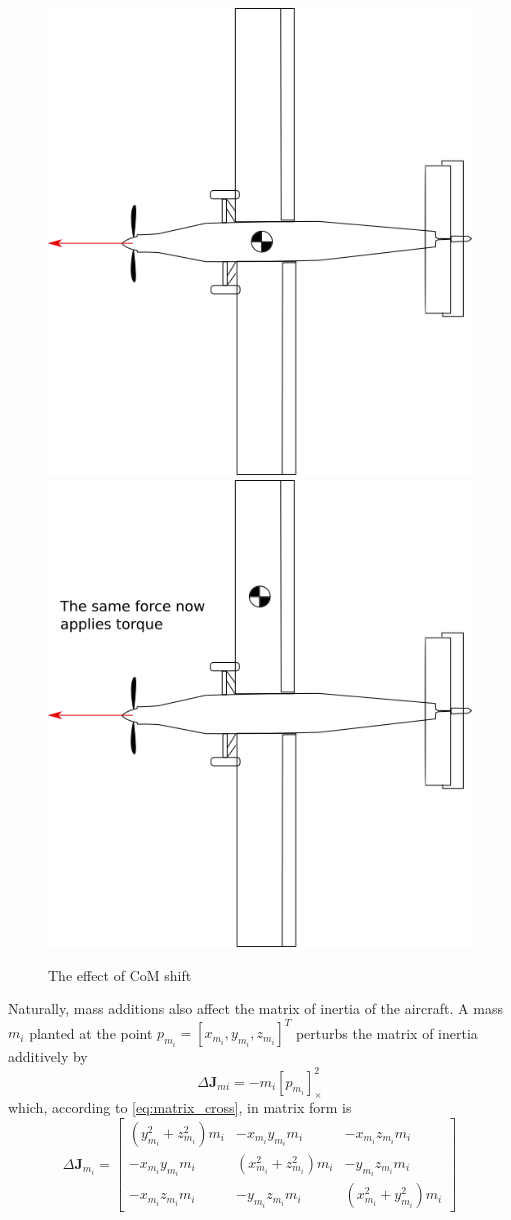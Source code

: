 \begin{figure}\label{fig:CM_shift}
\centering
\includegraphics[width=0.4\linewidth]{figures/CG_shift_normal}
\includegraphics[width=0.4\linewidth]{figures/CG_shift_shifted}
\caption[The effect of CoM shift]{The effect of CoM shift}
\label{fig:CG_shift}
\end{figure}

Naturally, mass additions also affect the matrix of inertia of the aircraft. A mass $m_{i}$ planted at the point $p_{m_i} = [x_{m_i}, y_{m_i}, z_{m_i}]^T$ perturbs the matrix of inertia additively by \cite{wiki:inertia_matrix}
%
\begin{equation}
	\Delta \bm{J}_{mi} = - m_i [p_{m_i}]_\times^2
\end{equation}
%
which, according to \ref{eq:matrix_cross}, in matrix form is
%
\begin{equation}
	\Delta \bm{J}_{m_i} =
	\begin{bmatrix}
		(y_{m_i}^2 + z_{m_i}^2) m_{i} & -x_{m_i} y_{m_i} m_i         & -x_{m_i}z_{m_i}m_i          \\
		-x_{m_i} y_{m_i} m_i          & (x_{m_i}^2 +  z_{m_i}^2) m_i & -y_{m_i} z_{m_i} m_i        \\
		-x_{m_i}z_{m_i}m_i            & -y_{m_i} z_{m_i} m_i         & (x_{m_i}^2 + y_{m_i}^2) m_i
	\end{bmatrix}
\end{equation}

